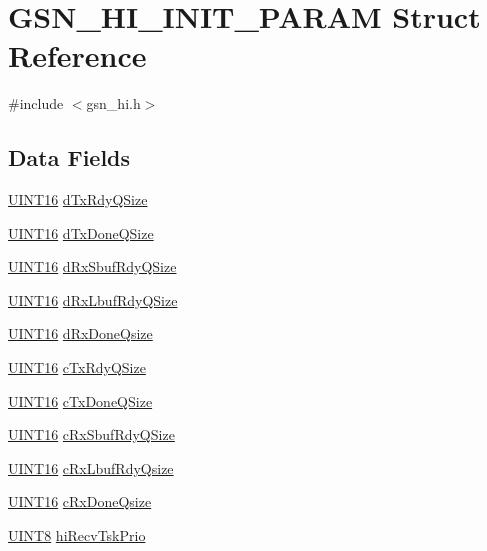 \hypertarget{a00088}{
\section{GSN\_\-HI\_\-INIT\_\-PARAM Struct Reference}
\label{a00088}
}


{\ttfamily \#include $<$gsn\_\-hi.h$>$}

\subsection*{Data Fields}
\begin{DoxyCompactItemize}
\item 
\hyperlink{a00660_ga09f1a1fb2293e33483cc8d44aefb1eb1}{UINT16} \hyperlink{a00088_aea4dec6fd05ca5c880a1529f5cbfd30c}{dTxRdyQSize}
\item 
\hyperlink{a00660_ga09f1a1fb2293e33483cc8d44aefb1eb1}{UINT16} \hyperlink{a00088_a6d448ba1a6b8a068dd73e569ae13081d}{dTxDoneQSize}
\item 
\hyperlink{a00660_ga09f1a1fb2293e33483cc8d44aefb1eb1}{UINT16} \hyperlink{a00088_aefc1dbd43600ea5825e89a8f1b676d33}{dRxSbufRdyQSize}
\item 
\hyperlink{a00660_ga09f1a1fb2293e33483cc8d44aefb1eb1}{UINT16} \hyperlink{a00088_a9511ef807fb9ae3fbc8e02e4af6314b9}{dRxLbufRdyQSize}
\item 
\hyperlink{a00660_ga09f1a1fb2293e33483cc8d44aefb1eb1}{UINT16} \hyperlink{a00088_a44f113b9f3e215da6932263d25b757f5}{dRxDoneQsize}
\item 
\hyperlink{a00660_ga09f1a1fb2293e33483cc8d44aefb1eb1}{UINT16} \hyperlink{a00088_a586624494aadf8cd9af5f4b33c4be4fb}{cTxRdyQSize}
\item 
\hyperlink{a00660_ga09f1a1fb2293e33483cc8d44aefb1eb1}{UINT16} \hyperlink{a00088_a923720e417574718447ce0a96182bd74}{cTxDoneQSize}
\item 
\hyperlink{a00660_ga09f1a1fb2293e33483cc8d44aefb1eb1}{UINT16} \hyperlink{a00088_a2d1acb3d451171b94c735e52e181e107}{cRxSbufRdyQSize}
\item 
\hyperlink{a00660_ga09f1a1fb2293e33483cc8d44aefb1eb1}{UINT16} \hyperlink{a00088_ac21b2c07570973b9baff2b492d13853a}{cRxLbufRdyQsize}
\item 
\hyperlink{a00660_ga09f1a1fb2293e33483cc8d44aefb1eb1}{UINT16} \hyperlink{a00088_a01336dac1014d0204e8e99074773f719}{cRxDoneQsize}
\item 
\hyperlink{a00660_gab27e9918b538ce9d8ca692479b375b6a}{UINT8} \hyperlink{a00088_a6bcdc2e315ddfd321e057c967fd0fe61}{hiRecvTskPrio}

\end{DoxyCompactItemize}
